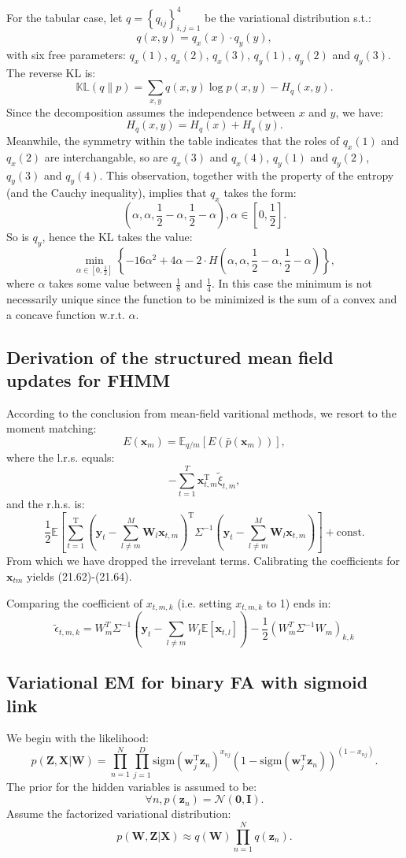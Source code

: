 \documentclass[UTF8]{ctexart}
\begin{document}
For the tabular case, let $q=\left\{q_{ij} \right\}_{i,j=1}^{4}$ be the variational distribution s.t.:
$$q(x,y)=q_{x}(x)\cdot q_{y}(y),$$
with six free parameters: $q_{x}(1)$, $q_{x}(2)$, $q_{x}(3)$, $q_{y}(1)$, $q_{y}(2)$ and $q_{y}(3)$. 
The reverse KL is:
$$\mathbb{KL}(q\|p)=\sum_{x,y}q(x,y)\log p(x,y)-H_{q}(x,y).$$
Since the decomposition assumes the independence between $x$ and $y$, we have:
$$H_{q}(x,y)=H_{q}(x)+H_{q}(y).$$
Meanwhile, the symmetry within the table indicates that the roles of $q_{x}(1)$ and $q_{x}(2)$ are interchangable, so are $q_{x}(3)$ and $q_{x}(4)$, $q_{y}(1)$ and $q_{y}(2)$, $q_{y}(3)$ and $q_{y}(4)$. 
This observation, together with the property of the entropy (and the Cauchy inequality), implies that $q_{x}$ takes the form:
$$(\alpha,\alpha,\frac{1}{2}-\alpha,\frac{1}{2}-\alpha),\alpha\in[0,\frac{1}{2}].$$
So is $q_{y}$, hence the KL takes the value:
$$\min_{\alpha\in\left[0,\frac{1}{2}\right]}\left\{-16\alpha^{2}+4\alpha-2\cdot H\left(\alpha,\alpha,\frac{1}{2}-\alpha,\frac{1}{2}-\alpha\right) \right\},$$
where $\alpha$ takes some value between $\frac{1}{8}$ and $\frac{1}{4}$.
In this case the minimum is not necessarily unique since the function to be minimized is the sum of a convex and a concave function w.r.t. $\alpha$. 

\subsection{Derivation of the structured mean field updates for FHMM}
According to the conclusion from mean-field varitional methods, we resort to the moment matching:
$$E(\textbf{x}_{m})=\mathbb{E}_{q/m}[E(\bar{p}(\textbf{x}_{m}))],$$
where the l.r.s. equals:
$$-\sum_{t=1}^{T}\textbf{x}^{\text{T}}_{t,m}\tilde{\xi}_{t,m},$$
and the r.h.s. is:
$$\frac{1}{2}\mathbb{E}\left[\sum_{t=1}^{\text{T}}\left(\textbf{y}_{t}-\sum_{l\neq m}^{M}\textbf{W}_{l}\textbf{x}_{t,m}\right)^{\text{T}}\Sigma^{-1}\left(\textbf{y}_{t}-\sum_{l\neq m}^{M}\textbf{W}_{l}\textbf{x}_{t,m}\right)\right]+\text{const}.$$
From which we have dropped the irrevelant terms. 
Calibrating the coefficients for $\textbf{x}_{tm}$ yields (21.62)-(21.64).

Comparing the coefficient of $x_{t,m,k}$ (i.e. setting $x_{t,m,k}$ to 1) ends in:
$$\tilde{\epsilon}_{t,m,k}=W^{T}_{m}\Sigma^{-1}(\textbf{y}_{t}-\sum_{l\neq m}W_{l}\mathbb{E}[\textbf{x}_{t,l}])-\frac{1}{2}(W^{T}_{m}\Sigma^{-1}W_{m})_{k,k}$$


\subsection{Variational EM for binary FA with sigmoid link}
We begin with the likelihood:
$$p(\textbf{Z},\textbf{X}|\textbf{W})=\prod_{n=1}^{N}\prod_{j=1}^{D}\text{sigm}(\textbf{w}_{j}^{\text{T}}\textbf{z}_{n})^{x_{nj}}(1-\text{sigm}(\textbf{w}_{j}^{\text{T}}\textbf{z}_{n}))^{(1-x_{nj})}.$$
The prior for the hidden variables is assumed to be:
$$\forall n,p(\textbf{z}_{n})=\mathcal{N}(\textbf{0},\textbf{I}).$$
Assume the factorized variational distribution:
$$p(\textbf{W},\textbf{Z}|\textbf{X})\approx q(\textbf{W})\prod_{n=1}^{N}q(\textbf{z}_{n}).$$
\end{document}
